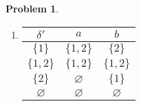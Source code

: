 \documentclass[11pt]{article}
\theoremstyle{definition}
\theoremstyle{case}
\theoremstyle{theorem}
\newtheorem{prob}{Problem}
\begin{document}
\newpage

\begin{prob}\end{prob}

\begin{enumerate}[label=(\alph*)]

\item

\begin{tabular}{|c||c|c|}

$\delta'$ & $a$ & $b$ \\

\hline

$\{1\}$ & $\{1,2\}$ & $\{2\}$ \\

\hline

$\{1,2\}$ & $\{1,2\}$ & $\{1,2\}$ \\

\hline

$\{2\}$ & $\varnothing$ & $\{1\}$ \\

\hline

$\varnothing$ & $\varnothing$ & $\varnothing$ \\
\end{tabular}

\begin{tikzpicture}[x=0.75pt,y=0.75pt,yscale=-1,xscale=1]


\end{tikzpicture}
\end{enumerate}
\end{document}
